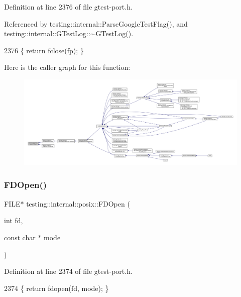 Definition at line 2376 of file gtest-\/port.\+h.



Referenced by testing\+::internal\+::\+Parse\+Google\+Test\+Flag(), and testing\+::internal\+::\+G\+Test\+Log\+::$\sim$\+G\+Test\+Log().


\begin{DoxyCode}
2376 \{ \textcolor{keywordflow}{return} fclose(fp); \}
\end{DoxyCode}
Here is the caller graph for this function\+:
\nopagebreak
\begin{figure}[H]
\begin{center}
\leavevmode
\includegraphics[width=350pt]{namespacetesting_1_1internal_1_1posix_af4beeaaa8d62916d5e3b644a1ddfbd6b_icgraph}
\end{center}
\end{figure}
\mbox{\label{namespacetesting_1_1internal_1_1posix_af7c268eba32d5a718b36b6b3801302e0}} 
\subsubsection{\texorpdfstring{F\+D\+Open()}{FDOpen()}}
{\footnotesize\ttfamily F\+I\+LE$\ast$ testing\+::internal\+::posix\+::\+F\+D\+Open (\begin{DoxyParamCaption}\item[{int}]{fd,  }\item[{const char $\ast$}]{mode }\end{DoxyParamCaption})\hspace{0.3cm}{\ttfamily [inline]}}



Definition at line 2374 of file gtest-\/port.\+h.


\begin{DoxyCode}
2374 \{ \textcolor{keywordflow}{return} fdopen(fd, mode); \}
\end{DoxyCode}
\mbox{\label{namespacetesting_1_1internal_1_1posix_a3117b067e1f942a2031e666953120ccc}} 
